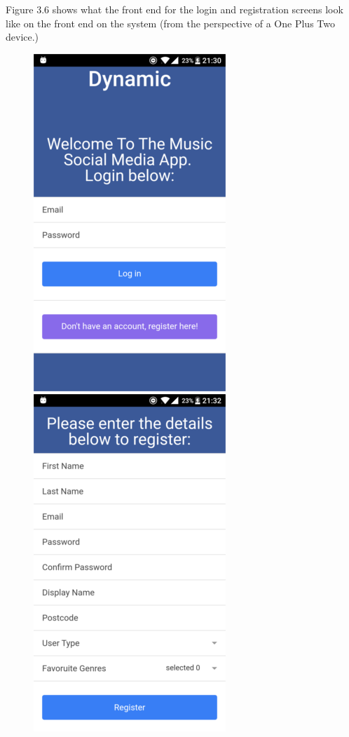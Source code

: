 Figure 3.6 shows what the front end for the login and registration screens look like on the front end on the system (from the perspective of a One Plus Two device.)
\begin{center}
\begin{figure}[H]
\includegraphics[scale=0.5]{images/sc1}
\includegraphics[scale=0.5]{images/sc2}

\end{figure}
\end{center}

